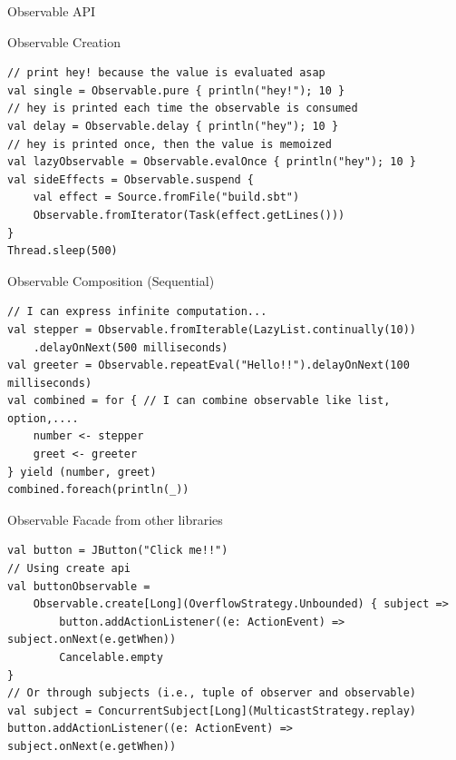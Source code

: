 \documentclass[presentation, 9pt]{beamer}\mode<presentation>{\usetheme{AMSBolognaFC}}
\begin{document}
\begin{frame}{Observable API}
	\begin{alertblock}{Observable Creation}
		\begin{tcolorbox}[left=0pt, top=0pt, bottom=0pt]
					 \begin{verbatim}
// print hey! because the value is evaluated asap
val single = Observable.pure { println("hey!"); 10 }
// hey is printed each time the observable is consumed
val delay = Observable.delay { println("hey"); 10 }
// hey is printed once, then the value is memoized
val lazyObservable = Observable.evalOnce { println("hey"); 10 } 
val sideEffects = Observable.suspend {
	val effect = Source.fromFile("build.sbt")
	Observable.fromIterator(Task(effect.getLines()))
}
Thread.sleep(500)
					 \end{verbatim}
				 \end{tcolorbox}
		 \end{alertblock}	

		 \begin{alertblock}{Observable Composition (Sequential)}
			\begin{tcolorbox}[left=0pt, top=0pt, bottom=0pt]
						 \begin{verbatim}
// I can express infinite computation...
val stepper = Observable.fromIterable(LazyList.continually(10))
	.delayOnNext(500 milliseconds)
val greeter = Observable.repeatEval("Hello!!").delayOnNext(100 milliseconds)
val combined = for { // I can combine observable like list, option,....
	number <- stepper
	greet <- greeter
} yield (number, greet)
combined.foreach(println(_))
						 \end{verbatim}
					 \end{tcolorbox}
			 \end{alertblock}	

			 \begin{alertblock}{Observable Facade from other libraries}
				\begin{tcolorbox}[left=0pt, top=0pt, bottom=0pt]
							 \begin{verbatim}
val button = JButton("Click me!!")
// Using create api
val buttonObservable = 
	Observable.create[Long](OverflowStrategy.Unbounded) { subject =>
		button.addActionListener((e: ActionEvent) => subject.onNext(e.getWhen))
		Cancelable.empty
}
// Or through subjects (i.e., tuple of observer and observable)
val subject = ConcurrentSubject[Long](MulticastStrategy.replay)
button.addActionListener((e: ActionEvent) => subject.onNext(e.getWhen))
							 \end{verbatim}
						 \end{tcolorbox}
				 \end{alertblock}	


\end{frame}
\end{document}
